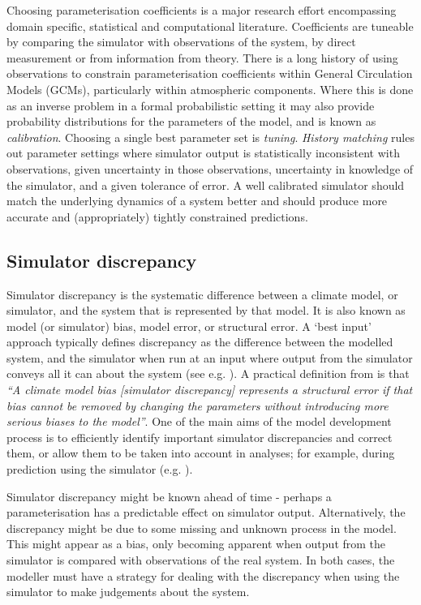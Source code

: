 \documentclass[esd, article]{copernicus} %
\begin{document}
Choosing parameterisation coefficients is a major research effort encompassing domain specific, statistical and computational literature. Coefficients are tuneable by comparing the simulator with observations of the system, by direct measurement or from information from theory. There is a long history of using observations to constrain parameterisation coefficients within General Circulation Models (GCMs), particularly within atmospheric components. Where this is done as an inverse problem in a formal probabilistic setting it may also provide probability distributions for the parameters of the model, and is known as \emph{calibration}. Choosing a single best parameter set is \emph{tuning}. \emph{History matching} rules out parameter settings where simulator output is statistically inconsistent with observations, given uncertainty in those observations, uncertainty in knowledge of the simulator, and a given tolerance of error. A well calibrated simulator should match the underlying dynamics of a system better and should produce more accurate and (appropriately) tightly constrained predictions. 

\subsection{Simulator discrepancy}

Simulator discrepancy is the systematic difference between a climate model, or simulator, and the system that is represented by that model. It is also known as model (or simulator) bias, model error, or structural error. A `best input' approach typically defines discrepancy as the difference between the modelled system, and the simulator when run at an input where output from the simulator conveys all it can about the system (see e.g. \cite{goldstein2009reified}). A practical definition from \cite{williamson2014identifying} is that \emph{``A climate model bias [simulator discrepancy] represents a structural error if that bias cannot be removed by changing the parameters without introducing more serious biases to the model''}. One of the main aims of the model development process is to efficiently identify important simulator discrepancies and correct them, or allow them to be taken into account in analyses; for example, during prediction using the simulator (e.g. \cite{sexton2011multivariate}).

Simulator discrepancy might be known ahead of time - perhaps a parameterisation has a predictable effect on simulator output. Alternatively, the discrepancy might be due to some missing and unknown process in the model. This might appear as a bias, only becoming apparent when output from the simulator is compared with observations of the real system. In both cases, the modeller must have a strategy for dealing with the discrepancy when using the simulator to make judgements about the system.
\end{document}
